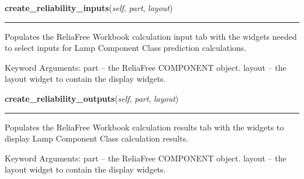     \label{reliafree:miscellaneous:lamp:Lamp:create_reliability_inputs}

    \vspace{0.5ex}

\hspace{.8\funcindent}\begin{boxedminipage}{\funcwidth}

    \raggedright \textbf{create\_reliability\_inputs}(\textit{self}, \textit{part}, \textit{layout})

    \vspace{-1.5ex}

    \rule{\textwidth}{0.5\fboxrule}
\setlength{\parskip}{2ex}
    Populates the ReliaFree Workbook calculation input tab with the widgets
    needed to select inputs for Lamp Component Class prediction 
    calculations.

    Keyword Arguments: part   -- the ReliaFree COMPONENT object. layout -- 
    the layout widget to contain the display widgets.

\setlength{\parskip}{1ex}
    \end{boxedminipage}

    \label{reliafree:miscellaneous:lamp:Lamp:create_reliability_outputs}

    \vspace{0.5ex}

\hspace{.8\funcindent}\begin{boxedminipage}{\funcwidth}

    \raggedright \textbf{create\_reliability\_outputs}(\textit{self}, \textit{part}, \textit{layout})

    \vspace{-1.5ex}

    \rule{\textwidth}{0.5\fboxrule}
\setlength{\parskip}{2ex}
    Populates the ReliaFree Workbook calculation results tab with the 
    widgets to display Lamp Component Class calculation results.

    Keyword Arguments: part   -- the ReliaFree COMPONENT object. layout -- 
    the layout widget to contain the display widgets.

\setlength{\parskip}{1ex}
    \end{boxedminipage}

